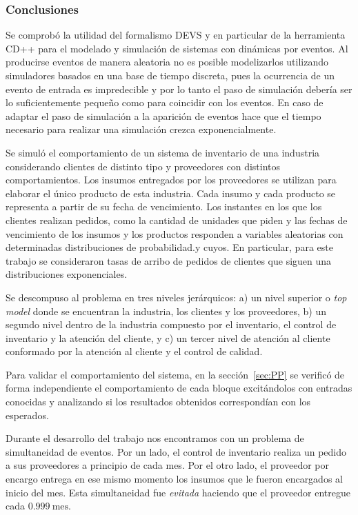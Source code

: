 \documentclass[10pt]{article}
\begin{document}
\subsubsection{Conclusiones}
Se comprobó la utilidad del formalismo DEVS y en particular de la herramienta CD++ para el modelado y simulación de sistemas con dinámicas por eventos. Al producirse eventos de manera aleatoria no es posible modelizarlos utilizando simuladores basados en una base de tiempo discreta, pues la ocurrencia de un evento de entrada es impredecible y por lo tanto el paso de simulación debería ser lo suficientemente pequeño como para coincidir con los eventos. En caso de adaptar el paso de simulación a la aparición de eventos hace que el tiempo necesario para realizar una simulación crezca exponencialmente.

Se simuló el comportamiento de un sistema de inventario de una industria considerando clientes de distinto tipo y proveedores con distintos comportamientos. Los insumos entregados por los proveedores se utilizan para elaborar el único producto de esta industria. Cada insumo y cada producto se representa a partir de su fecha de vencimiento. Los instantes en los que los clientes realizan pedidos, como la cantidad de unidades que piden y las fechas de vencimiento de los insumos y los productos responden a variables aleatorias con determinadas distribuciones de probabilidad.y cuyos. En particular, para este trabajo se consideraron tasas de arribo de pedidos de clientes que siguen una distribuciones exponenciales.

Se descompuso al problema en tres niveles jerárquicos: a) un nivel superior o \textit{top model} donde se encuentran la industria, los clientes y los proveedores, b) un segundo nivel dentro de la industria compuesto por el inventario, el control de inventario y la atención del cliente, y c) un tercer nivel de atención al cliente conformado por la atención al cliente y el control de calidad.

Para validar el comportamiento del sistema, en la sección~\ref{sec:PP} se verificó de forma independiente el comportamiento de cada bloque excitándolos con entradas conocidas y analizando si los resultados obtenidos correspondían con los esperados.

Durante el desarrollo del trabajo nos encontramos con un problema de simultaneidad de eventos. Por un lado, el control de inventario realiza un pedido a sus proveedores a principio de cada mes. Por el otro lado, el proveedor por encargo entrega en ese mismo momento los insumos que le fueron encargados al inicio del mes. Esta simultaneidad fue \textit{evitada} haciendo que el proveedor entregue cada $0.999~\textrm{mes}$. 
\end{document}

